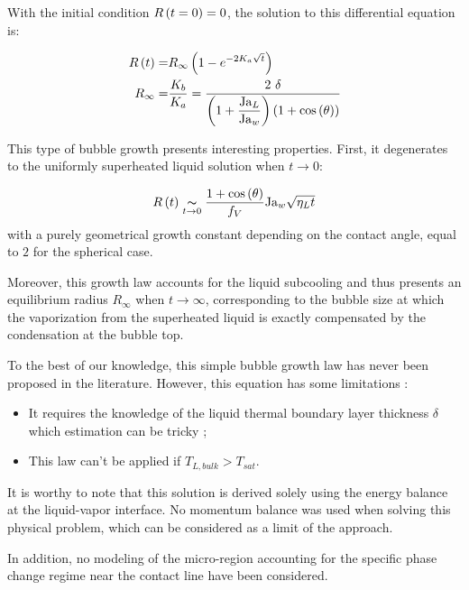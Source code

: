 \npar

With the initial condition $R\left( t=0 \right)=0$, the solution to this differential equation is: 

\begin{align}
R\parth{t}=&R_{\infty}\parth{1-e^{-2K_{a}\sqrt{t}}}
\label{eq:exp_growth} \\
R_{\infty}=&\frac{K_{b}}{K_{a}} = \frac{2\ \delta}{\parth{1+\dfrac{\Ja_{L}}{\Ja_{w}} } \parth{1+\cos{\theta} } }
\label{eq:eq_radius_expgrowth}
\end{align}

\npar

This type of bubble growth presents interesting properties. First, it degenerates to the uniformly superheated liquid solution when $t \to 0$:

\begin{equation}
R\left( t \right) \underset{t \to 0}{\thicksim} \frac{1+\mathrm{cos}\left( \theta \right)}{f_{V}}\mathrm{Ja}_{w} \sqrt{\eta_{L}t}
\end{equation}
with a purely geometrical growth constant depending on the contact angle, equal to $2$ for the spherical case.

\npar
Moreover, this growth law accounts for the liquid subcooling and thus presents an equilibrium radius $R_{\infty}$ when $t\to \infty$, corresponding to the bubble size at which the vaporization from the superheated liquid is exactly compensated by the condensation at the bubble top.

\npar
To the best of our knowledge, this simple bubble growth law has never been proposed in the literature. However, this equation has some limitations :

\begin{itemize}
\item It requires the knowledge of the liquid thermal boundary layer thickness $\delta$ which estimation can be tricky ;

\item This law can't be applied if $T_{L,bulk}>T_{sat}$.
\end{itemize} 


\begin{remark*}{}
It is worthy to note that this solution is derived solely using the energy balance at the liquid-vapor interface. No momentum balance was used when solving this physical problem, which can be considered as a limit of the approach.

\npar

In addition, no modeling of the micro-region accounting for the specific phase change regime near the contact line have been considered.
\end{remark*}



